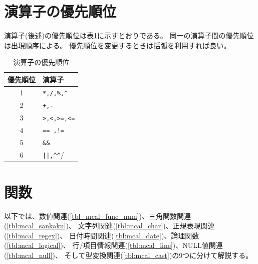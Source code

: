 \section{演算子の優先順位}
演算子(後述)の優先順位は表\ref{tbl:mcal_pri_ope}に示すとおりである。
同一の演算子間の優先順位は出現順序による。
優先順位を変更するときは括弧を利用すれば良い。

\begin{table}[!hb]
\begin{center}
\caption{演算子の優先順位\label{tbl:mcal_pri_ope}}
{\small
  \begin{tabular}{c|l} \hline
優先順位&演算子\\ \hline
1 & \verb|*,/,%,^| \\
2 & \verb|+,-|  \\
3 & \verb|>,<,>=,<=| \\ 
4 & \verb|== ,!=|  \\
5 & \verb|&&|  \\
6 & \verb/||,^^/  \\
\hline
  \end{tabular}
  }
  \end{center}
\end{table}


\section{関数}
以下では、数値関連(\ref{tbl_mcal_func_num})、三角関数関連(\ref{tbl:mcal_sankaku})、
文字列関連(\ref{tbl:mcal_char})、正規表現関連(\ref{tbl:mcal_regex})、
日付時間関連(\ref{tbl:mcal_date})、論理関数(\ref{tbl:mcal_logical})、
行/項目情報関連(\ref{tbl:mcal_line})、NULL値関連(\ref{tbl:mcal_null})、
そして型変換関連(\ref{tbl:mcal_cast})の9つに分けて解説する。

